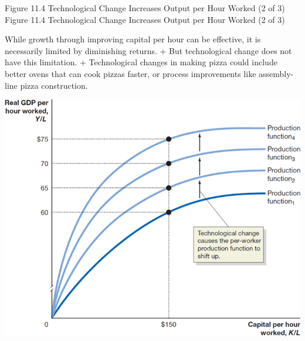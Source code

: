 \documentclass[
  12pt,
  ignorenonframetext,
]{beamer}
\begin{document}
\begin{frame}{Figure 11.4 Technological Change Increases Output per Hour
Worked (2 of 3)}
\protect\hypertarget{figure-11.4-technological-change-increases-output-per-hour-worked-2-of-3}{}
Figure 11.4 Technological Change Increases Output per Hour Worked (2 of
3)

While growth through improving capital per hour can be effective, it is
necessarily limited by diminishing returns. + But technological change
does not have this limitation. + Technological changes in making pizza
could include better ovens that can cook pizzas faster, or process
improvements like assembly-line pizza construction.

\includegraphics[width=\textwidth,height=0.99\textheight]{imgs3/img_slide21a.png}
\end{frame}
\end{document}

